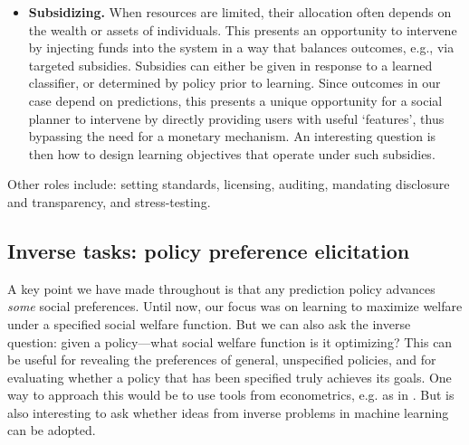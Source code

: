 \begin{itemize}[leftmargin=1em,topsep=0em,itemsep=0.3em]
\item \textbf{Subsidizing.}
When resources are limited, their allocation often depends on the wealth or assets of individuals.
This presents an opportunity to intervene by injecting funds into the system in a way that balances outcomes, e.g., via targeted subsidies.
Subsidies can either be given in response to a learned classifier,
or determined by policy prior to learning.
Since outcomes in our case depend on predictions,
this presents a unique opportunity for a social planner to intervene by directly providing users with useful `features',
thus bypassing the need for a monetary mechanism.
An interesting question is then how to design learning objectives that operate under such subsidies.


\end{itemize}

Other roles include:
setting standards, licensing, auditing,
mandating disclosure and transparency, and stress-testing.

\subsection{Inverse tasks: policy preference elicitation}
A key point we have made throughout is that 
any prediction policy advances \emph{some} social preferences.
Until now, our focus was on learning to maximize welfare under a specified social welfare function.
But we can also ask the inverse question:
given a policy---what social welfare function is it optimizing?
This can be useful for revealing the preferences of general,
unspecified policies,
and for evaluating whether a policy that has been specified truly achieves its goals.
One way to approach this would be to use tools from econometrics,
e.g. as in \citep{bjorkegren2022machinelearningpoliciesvalue,pardeshi2024learning}.
But is also interesting to ask whether ideas from inverse problems in machine learning can be adopted.





